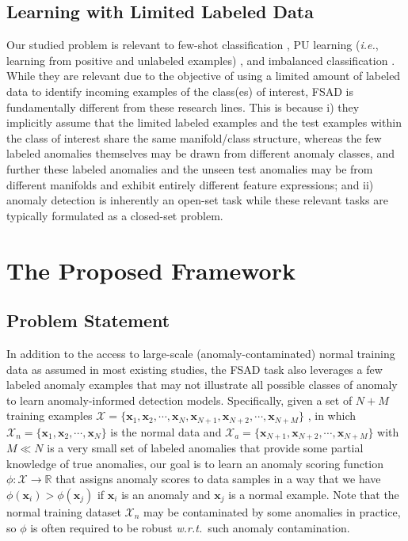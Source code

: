 \documentclass[10pt,journal,compsoc]{IEEEtran}
\begin{document}
\subsection{Learning with 
Limited Labeled Data}

Our studied problem is relevant to few-shot classification \cite{wang2020generalizing}, PU learning (\textit{i.e.}, learning from positive and unlabeled examples) \cite{bekker2020learning}, and imbalanced classification \cite{he2009imbalance,branco2016survey}. While they are relevant due to the objective of using a limited amount of labeled data to identify incoming examples of the class(es) of interest, FSAD is fundamentally different from these research lines. This is because i) they implicitly assume that the limited labeled examples and the test examples within the class of interest share the same manifold/class structure, whereas the few labeled anomalies themselves may be drawn from different anomaly classes, and further these labeled anomalies and the unseen test anomalies may be from different manifolds and exhibit entirely different feature expressions; and ii) anomaly detection is inherently an open-set task while these relevant tasks are typically formulated as a closed-set problem. 


\section{The Proposed Framework}

\subsection{Problem Statement}

In addition to the access to large-scale (anomaly-contaminated) normal training data as assumed in most existing studies, the FSAD task also leverages a few labeled anomaly examples that may not illustrate all possible  classes  of  anomaly to learn anomaly-informed detection models. Specifically, given a set of $N+M$ training examples $\mathcal{X}=\{ \mathbf{x}_{1}, \mathbf{x}_{2}, \cdots, \mathbf{x}_{N}, \mathbf{x}_{N+1}, \mathbf{x}_{N+2}, \cdots, \mathbf{x}_{N+M} \}$
, in which $\mathcal{X}_n=\{ \mathbf{x}_{1}, \mathbf{x}_{2}, \cdots, \mathbf{x}_{N}\}$ is the normal data and $\mathcal{X}_a=\{\mathbf{x}_{N+1}, \mathbf{x}_{N+2}, \cdots, \mathbf{x}_{N+M} \}$ with $M\ll N$ is a very small set of labeled anomalies that provide some partial knowledge of true anomalies, our goal is to learn an anomaly scoring function $\phi: \mathcal{X} \rightarrow \mathbb{R}$ that assigns anomaly scores to data samples in a way that we have $\phi(\mathbf{x}_{i}) > \phi(\mathbf{x}_{j})$ if $\mathbf{x}_{i}$ is an anomaly and $\mathbf{x}_{j}$ is a normal example. Note that the normal training dataset $\mathcal{X}_n$ may be contaminated by some anomalies in practice, so $\phi$ is often required to be robust \textit{w.r.t.}\   such anomaly contamination.
\end{document}
